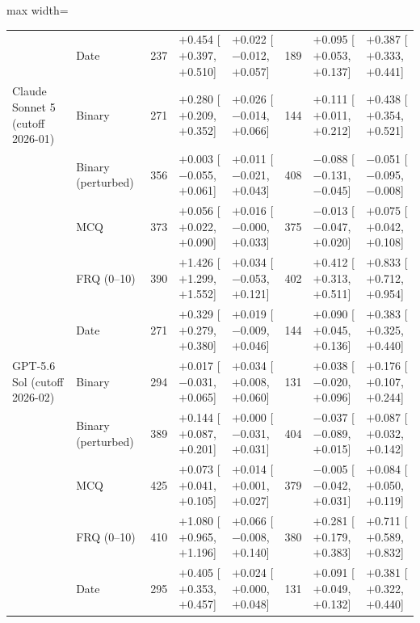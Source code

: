 \begin{table}[htbp]
\begin{adjustbox}{max width=\textwidth}
\begin{tabular}{l l r l l r l l}
 & Date & 237 & $+$0.454 {\scriptsize[$+$0.397, $+$0.510]} & $+$0.022 {\scriptsize[$-$0.012, $+$0.057]} & 189 & $+$0.095 {\scriptsize[$+$0.053, $+$0.137]} & $+$0.387 {\scriptsize[$+$0.333, $+$0.441]} \\
\addlinespace
Claude Sonnet 5 (cutoff 2026-01) & Binary & 271 & $+$0.280 {\scriptsize[$+$0.209, $+$0.352]} & $+$0.026 {\scriptsize[$-$0.014, $+$0.066]} & 144 & $+$0.111 {\scriptsize[$+$0.011, $+$0.212]} & $+$0.438 {\scriptsize[$+$0.354, $+$0.521]} \\
 & Binary (perturbed) & 356 & $+$0.003 {\scriptsize[$-$0.055, $+$0.061]} & $+$0.011 {\scriptsize[$-$0.021, $+$0.043]} & 408 & $-$0.088 {\scriptsize[$-$0.131, $-$0.045]} & $-$0.051 {\scriptsize[$-$0.095, $-$0.008]} \\
 & MCQ & 373 & $+$0.056 {\scriptsize[$+$0.022, $+$0.090]} & $+$0.016 {\scriptsize[$-$0.000, $+$0.033]} & 375 & $-$0.013 {\scriptsize[$-$0.047, $+$0.020]} & $+$0.075 {\scriptsize[$+$0.042, $+$0.108]} \\
 & FRQ (0--10) & 390 & $+$1.426 {\scriptsize[$+$1.299, $+$1.552]} & $+$0.034 {\scriptsize[$-$0.053, $+$0.121]} & 402 & $+$0.412 {\scriptsize[$+$0.313, $+$0.511]} & $+$0.833 {\scriptsize[$+$0.712, $+$0.954]} \\
 & Date & 271 & $+$0.329 {\scriptsize[$+$0.279, $+$0.380]} & $+$0.019 {\scriptsize[$-$0.009, $+$0.046]} & 144 & $+$0.090 {\scriptsize[$+$0.045, $+$0.136]} & $+$0.383 {\scriptsize[$+$0.325, $+$0.440]} \\
\addlinespace
GPT-5.6 Sol (cutoff 2026-02) & Binary & 294 & $+$0.017 {\scriptsize[$-$0.031, $+$0.065]} & $+$0.034 {\scriptsize[$+$0.008, $+$0.060]} & 131 & $+$0.038 {\scriptsize[$-$0.020, $+$0.096]} & $+$0.176 {\scriptsize[$+$0.107, $+$0.244]} \\
 & Binary (perturbed) & 389 & $+$0.144 {\scriptsize[$+$0.087, $+$0.201]} & $+$0.000 {\scriptsize[$-$0.031, $+$0.031]} & 404 & $-$0.037 {\scriptsize[$-$0.089, $+$0.015]} & $+$0.087 {\scriptsize[$+$0.032, $+$0.142]} \\
 & MCQ & 425 & $+$0.073 {\scriptsize[$+$0.041, $+$0.105]} & $+$0.014 {\scriptsize[$+$0.001, $+$0.027]} & 379 & $-$0.005 {\scriptsize[$-$0.042, $+$0.031]} & $+$0.084 {\scriptsize[$+$0.050, $+$0.119]} \\
 & FRQ (0--10) & 410 & $+$1.080 {\scriptsize[$+$0.965, $+$1.196]} & $+$0.066 {\scriptsize[$-$0.008, $+$0.140]} & 380 & $+$0.281 {\scriptsize[$+$0.179, $+$0.383]} & $+$0.711 {\scriptsize[$+$0.589, $+$0.832]} \\
 & Date & 295 & $+$0.405 {\scriptsize[$+$0.353, $+$0.457]} & $+$0.024 {\scriptsize[$+$0.000, $+$0.048]} & 131 & $+$0.091 {\scriptsize[$+$0.049, $+$0.132]} & $+$0.381 {\scriptsize[$+$0.322, $+$0.440]} \\
\bottomrule
\end{tabular}
\end{adjustbox}
\end{table}
